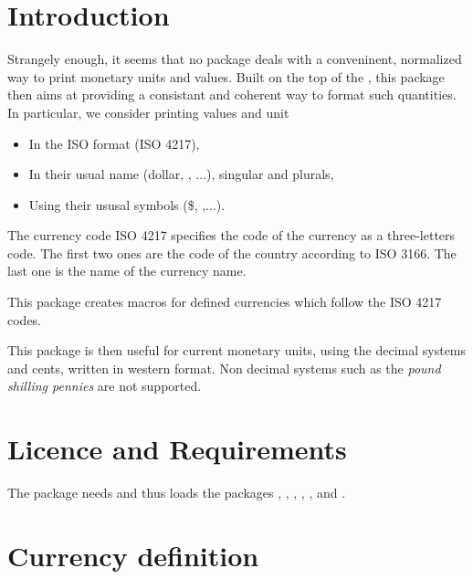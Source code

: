 \documentclass[12pt,add-index]{cnltx-doc}
\begin{document}
\section{Introduction}

Strangely enough, it seems that no package deals with a conveninent, 
normalized way to print monetary units and values. Built on the top
of the , this package 
then aims at providing a consistant and coherent way to format such 
quantities. In particular, we consider printing values and unit 
\begin{itemize}[noitemsep=0pt,topsep=0pt]
\item In the ISO format (ISO 4217),
\item In their usual name (dollar, \cEUR[kind=name], ...), singular and plurals,
\item Using their ususal symbols (\$, \cEUR[kind=symbol],...).
\end{itemize}

The currency code ISO 4217 specifies the code of the currency as
a three-letters code. The first two ones are the code of the country
according to ISO 3166. The last one is the name of the currency name. 

This package creates macros for defined currencies which follow
the ISO 4217 codes. 

This package is then useful for current monetary units, using 
the decimal systems and cents, written in western format.
Non decimal systems such as 
the \emph{pound shilling pennies} are not supported. 

\section{Licence and Requirements}
\license

The  package needs and thus loads the packages
, , , , 
,  and .

 
\section{Currency definition}
\end{document}
